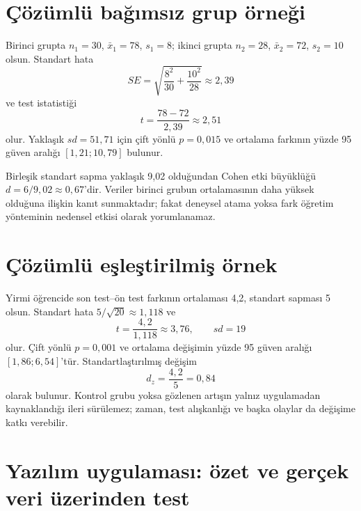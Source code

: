 \section{Çözümlü bağımsız grup örneği}

Birinci grupta $n_1=30$, $\bar x_1=78$, $s_1=8$; ikinci grupta
$n_2=28$, $\bar x_2=72$, $s_2=10$ olsun. Standart hata
\[
SE=\sqrt{\frac{8^2}{30}+\frac{10^2}{28}}\approx2{,}39
\]
ve test istatistiği
\[
t=\frac{78-72}{2{,}39}\approx2{,}51
\]
olur. Yaklaşık $sd=51{,}71$ için çift yönlü $p=0{,}015$ ve ortalama farkının
yüzde 95 güven aralığı $[1{,}21;10{,}79]$ bulunur.

Birleşik standart sapma yaklaşık 9,02 olduğundan Cohen etki büyüklüğü
$d=6/9{,}02\approx0{,}67$'dir. Veriler birinci grubun ortalamasının daha
yüksek olduğuna ilişkin kanıt sunmaktadır; fakat deneysel atama yoksa fark
öğretim yönteminin nedensel etkisi olarak yorumlanamaz.

\section{Çözümlü eşleştirilmiş örnek}

Yirmi öğrencide son test--ön test farkının ortalaması 4,2, standart sapması 5
olsun. Standart hata $5/\sqrt{20}\approx1{,}118$ ve
\[
t=\frac{4{,}2}{1{,}118}\approx3{,}76,
\qquad sd=19
\]
olur. Çift yönlü $p=0{,}001$ ve ortalama değişimin yüzde 95 güven aralığı
$[1{,}86;6{,}54]$'tür. Standartlaştırılmış değişim
\[
d_z=\frac{4{,}2}{5}=0{,}84
\]
olarak bulunur. Kontrol grubu yoksa gözlenen artışın yalnız uygulamadan
kaynaklandığı ileri sürülemez; zaman, test alışkanlığı ve başka olaylar da
değişime katkı verebilir.

\section{Yazılım uygulaması: özet ve gerçek veri üzerinden test}

